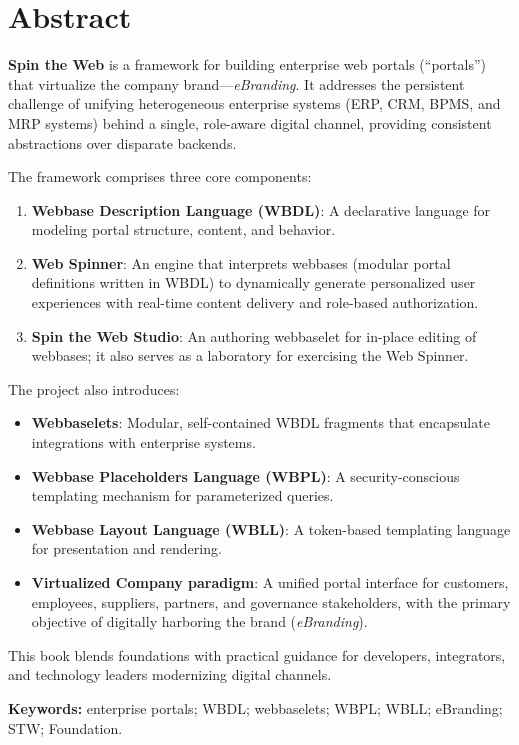 
\chapter*{Abstract}

\textbf{Spin the Web} is a framework for building enterprise web portals (``portals'') that virtualize the company brand—\textit{eBranding}. It addresses the persistent challenge of unifying heterogeneous enterprise systems (ERP, CRM, BPMS, and MRP systems) behind a single, role-aware digital channel, providing consistent abstractions over disparate backends.

The framework comprises three core components:
\begin{enumerate}
\item \textbf{Webbase Description Language (WBDL)}: A declarative language for modeling portal structure, content, and behavior.
\item \textbf{Web Spinner}: An engine that interprets webbases (modular portal definitions written in WBDL) to dynamically generate personalized user experiences with real-time content delivery and role-based authorization.
\item \textbf{Spin the Web Studio}: An authoring webbaselet for in-place editing of webbases; it also serves as a laboratory for exercising the Web Spinner.
\end{enumerate}

The project also introduces:
\begin{itemize}
\item \textbf{Webbaselets}: Modular, self-contained WBDL fragments that encapsulate integrations with enterprise systems.
\item \textbf{Webbase Placeholders Language (WBPL)}: A security-conscious templating mechanism for parameterized queries.
\item \textbf{Webbase Layout Language (WBLL)}: A token-based templating language for presentation and rendering.
\item \textbf{Virtualized Company paradigm}: A unified portal interface for customers, employees, suppliers, partners, and governance stakeholders, with the primary objective of digitally harboring the brand (\textit{eBranding}).
\end{itemize}

This book blends foundations with practical guidance for developers, integrators, and technology leaders modernizing digital channels.

\textbf{Keywords:} enterprise portals; WBDL; webbaselets; WBPL; WBLL; eBranding; STW; Foundation.

\clearpage
